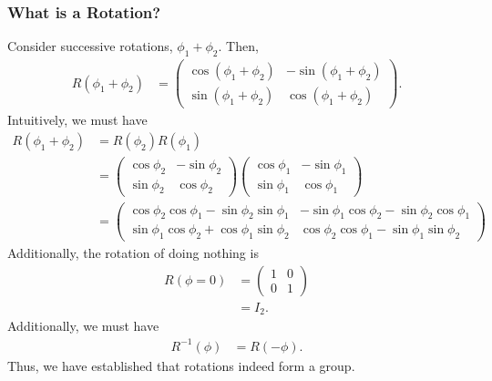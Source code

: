 \documentclass[10pt]{mypackage}
\begin{document}
\subsubsection{What is a Rotation?}%
Consider successive rotations, $\phi_1 + \phi_2$. Then,
\begin{align*}
  R\left(\phi_1 + \phi_2\right) &= \begin{pmatrix}\cos\left(\phi_1 + \phi_2\right) & -\sin\left(\phi_1 + \phi_2\right) \\ \sin\left(\phi_1 + \phi_2\right) & \cos\left(\phi_1 + \phi_2\right)\end{pmatrix}.
\end{align*}
Intuitively, we must have
\begin{align*}
  R\left(\phi_1 + \phi_2\right) &= R\left(\phi_2\right)R\left(\phi_1\right)\\
                                &= \begin{pmatrix}\cos\phi_2 & -\sin\phi_2 \\ \sin\phi_2 & \cos\phi_2\end{pmatrix} \begin{pmatrix}\cos\phi_1 & -\sin\phi_1\\\sin\phi_1 & \cos\phi_1\end{pmatrix}\\
                                &= \begin{pmatrix}\cos\phi_2\cos\phi_1 - \sin\phi_2\sin\phi_1 & -\sin\phi_1\cos\phi_2 - \sin\phi_2\cos\phi_1 \\ \sin\phi_1\cos\phi_2 + \cos\phi_1\sin\phi_2 & \cos\phi_2 \cos\phi_1 - \sin\phi_1\sin\phi_2 \end{pmatrix}
\end{align*}
Additionally, the rotation of doing nothing is
\begin{align*}
  R\left(\phi=0\right) &= \begin{pmatrix}1 & 0 \\ 0 & 1\end{pmatrix}\\
                       &= I_{2}.
\end{align*}
Additionally, we must have
\begin{align*}
  R^{-1}\left(\phi\right) &= R\left(-\phi\right).
\end{align*}
Thus, we have established that rotations indeed form a group.
\end{document}
